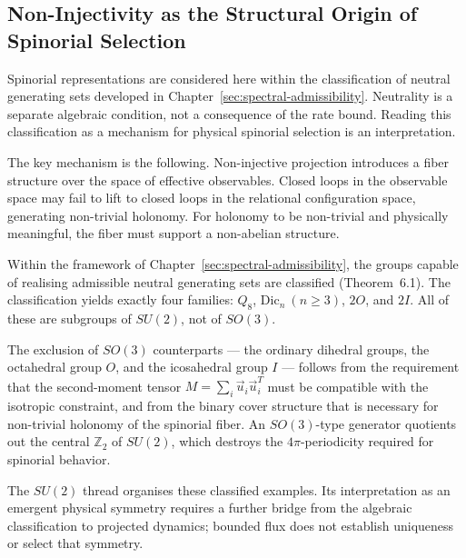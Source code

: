 \subsection{Non-Injectivity as the Structural Origin of Spinorial Selection}
  \label{subsec:non-injectivity-spinorial}

  Spinorial representations are considered here within the classification of neutral generating sets
  developed in Chapter~\ref{sec:spectral-admissibility}.
  Neutrality is a separate algebraic condition, not a consequence of the rate bound.
  Reading this classification as a mechanism for physical spinorial selection is an interpretation.

  The key mechanism is the following.
  Non-injective projection introduces a fiber structure over the space of effective
  observables.
  Closed loops in the observable space may fail to lift to closed loops in the relational
  configuration space, generating non-trivial holonomy.
  For holonomy to be non-trivial and physically meaningful, the fiber must support a
  non-abelian structure.

  Within the framework of Chapter~\ref{sec:spectral-admissibility}, the groups capable
  of realising admissible neutral generating sets are classified (Theorem~6.1).
  The classification yields exactly four families:
  $Q_8$, $\mathrm{Dic}_n\ (n\geq 3)$, $2O$, and $2I$.
  All of these are subgroups of $SU(2)$, not of $SO(3)$.

  The exclusion of $SO(3)$ counterparts --- the ordinary dihedral groups, the octahedral
  group $O$, and the icosahedral group $I$ --- follows from the requirement that the
  second-moment tensor $M = \sum_i \vec{u}_i \vec{u}_i^T$ must be compatible with
  the isotropic constraint, and from the binary cover structure that is necessary for
  non-trivial holonomy of the spinorial fiber.
  An $SO(3)$-type generator quotients out the central $\mathbb{Z}_2$ of $SU(2)$, which
  destroys the $4\pi$-periodicity required for spinorial behavior.

  The $SU(2)$ thread organises these classified examples.
  Its interpretation as an emergent physical symmetry requires a further bridge from the algebraic
  classification to projected dynamics; bounded flux does not establish uniqueness or select that symmetry.

